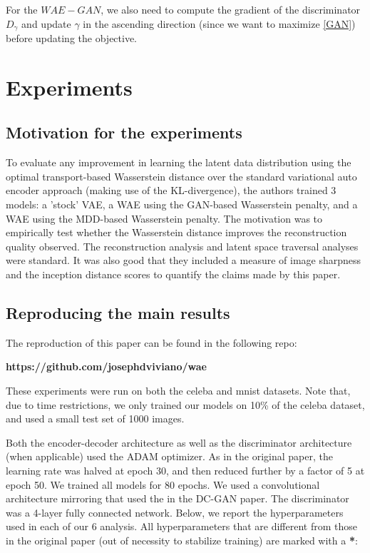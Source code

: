 \documentclass[12pt,english]{amsart}
\begin{document}
For the $WAE-GAN$, we also need to compute the gradient of the discriminator $D_{\gamma}$ and update $\gamma$ in the ascending direction (since we want to maximize \eqref{GAN}) before updating the objective.

\section{Experiments}

\subsection{Motivation for the experiments}

To evaluate any improvement in learning the latent data distribution using
the optimal transport-based Wasserstein distance over the standard variational
auto encoder approach (making use of the KL-divergence), the authors trained 3
models: a 'stock' VAE, a WAE using the GAN-based Wasserstein penalty, and a WAE
using the MDD-based Wasserstein penalty. The motivation was to empirically test
whether the Wasserstein distance improves the reconstruction quality observed.
The reconstruction analysis and latent space traversal analyses were standard.
It was also good that they included a measure of image sharpness and the
inception distance scores to quantify the claims made by this paper.

\subsection{Reproducing the main results}

The reproduction of this paper can be found in the following repo:\\

\begin{center}
\textbf{https://github.com/josephdviviano/wae}
\end{center}

These experiments were run on both the celeba and mnist datasets. Note that,
due to time restrictions, we only trained our models on 10\% of the celeba
dataset, and used a small test set of 1000 images.

Both the encoder-decoder architecture as well as the discriminator architecture
(when applicable) used the ADAM optimizer. As in the original paper, the
learning rate was halved at epoch 30, and then reduced further by a factor of 5
at epoch 50. We trained all models for 80 epochs. We used a convolutional
architecture mirroring that used the in the DC-GAN paper. The discriminator was
a 4-layer fully connected network. Below, we report the  hyperparameters used in
each of our 6 analysis. All hyperparameters that are different from those in the
original paper (out of necessity to stabilize training) are marked with a
\textbf{*}:\\
\end{document}
